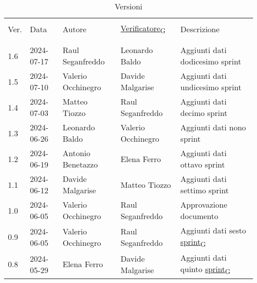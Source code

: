 \documentclass[12pt]{article} %
\begin{document}


\newpage



\begin{table}[!h]
	\footnotesize
	\begin{center}
		\caption*{Versioni}
		\vspace{0.5cm}
		\begin{tabular}{ l l l l p{6cm} }
			\hline                                                                                          \\[-2ex]
			Ver. & Data & Autore & \href{https://7last.github.io/docs/pb/documentazione-interna/glossario\#verificatore}{Verificatore\textsubscript{G}} & Descrizione \\
			\\[-2ex] \hline \\[-1.5ex]
			1.6 & 2024-07-17 & Raul Seganfreddo   & Leonardo Baldo     & Aggiunti dati dodicesimo sprint\\
			1.5 & 2024-07-10 & Valerio Occhinegro & Davide Malgarise   & Aggiunti dati undicesimo sprint\\
			1.4 & 2024-07-03 & Matteo Tiozzo      & Raul Seganfreddo   & Aggiunti dati decimo sprint\\
			1.3 & 2024-06-26 & Leonardo Baldo     & Valerio Occhinegro & Aggiunti dati nono sprint\\
			1.2 & 2024-06-19 & Antonio Benetazzo  & Elena Ferro        & Aggiunti dati ottavo sprint\\
			1.1 & 2024-06-12 & Davide Malgarise   & Matteo Tiozzo      & Aggiunti dati settimo sprint\\
			1.0 & 2024-06-05 & Valerio Occhinegro & Raul Seganfreddo   & Approvazione documento\\
			0.9 & 2024-06-05 & Valerio Occhinegro & Raul Seganfreddo   & Aggiunti dati sesto \href{https://7last.github.io/docs/pb/documentazione-interna/glossario\#sprint}{sprint\textsubscript{G}}\\
			0.8 & 2024-05-29 & Elena Ferro        & Davide Malgarise   & Aggiunti dati quinto \href{https://7last.github.io/docs/pb/documentazione-interna/glossario\#sprint}{sprint\textsubscript{G}}\\

\end{tabular}
\end{center}
\end{table}
\end{document}
